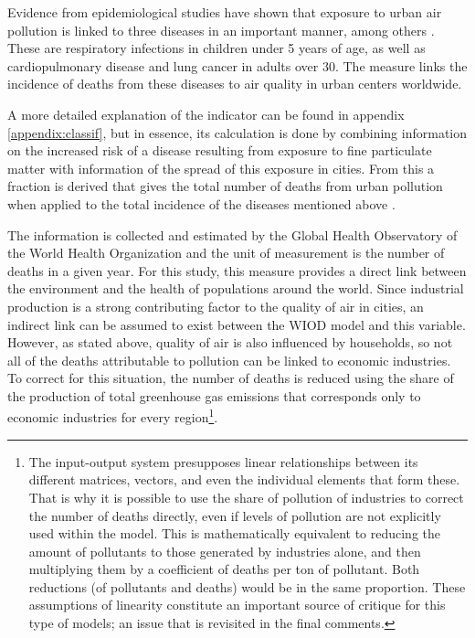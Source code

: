 \documentclass[a4paper,12pt, ]{article}
\begin{document}
Evidence from epidemiological studies have shown that exposure to urban air pollution is linked to three diseases in an important manner, among others \citep{ostro2004outdoor}. These are respiratory infections in children under 5 years of age,  as well as cardiopulmonary disease and lung cancer in adults over 30. The measure links the incidence of deaths from these diseases to air quality in urban centers worldwide.

A more detailed explanation of the indicator can be found in appendix \ref{appendix:classif}, but in essence, its calculation is done by combining information on the increased risk of a disease resulting from exposure to fine particulate matter with information of the spread of this exposure in cities. From this a fraction is derived that gives the total number of deaths from urban pollution when applied to the total incidence of the diseases mentioned above \citep*{who2012}.

The information is collected and estimated by the Global Health Observatory of the World Health Organization and the unit of measurement is the number of deaths in a given year. For this study, this measure provides a direct link between the environment and the health of populations around the world. Since industrial production is a strong contributing factor to the quality of air in cities, an indirect link can be assumed to exist between the WIOD model and this variable. However, as stated above, quality of air is also influenced by households, so not all of the deaths attributable to pollution can be linked to economic industries. To correct for this situation, the number of deaths is reduced using the share of the production of total greenhouse gas emissions that corresponds only to economic industries for every region\footnote{The input-output system presupposes linear relationships between its different matrices, vectors, and even the individual elements that form these. That is why it is possible to use the share of pollution of industries to correct the number of deaths directly, even if levels of pollution are not explicitly used within the model. This is mathematically equivalent to reducing the amount of pollutants to those generated by industries alone, and then multiplying them by a coefficient of deaths per ton of pollutant. Both reductions (of pollutants and deaths) would be in the same proportion. These assumptions of linearity constitute an important source of critique for this type of models; an issue that is revisited in the final comments.}.
\end{document}
